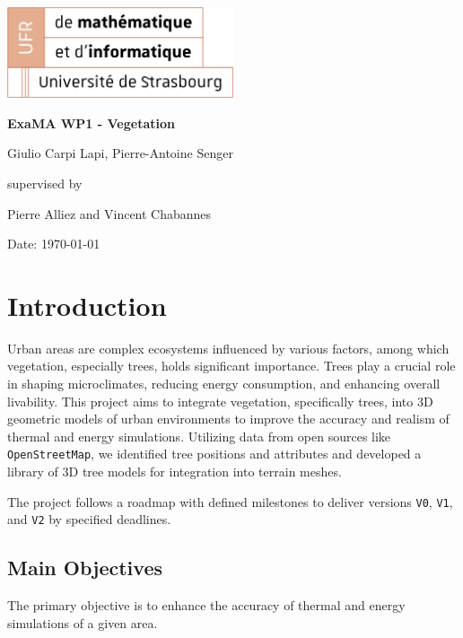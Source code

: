 \documentclass[12pt]{article}
\begin{document}
\begin{titlepage}
\centering
\includegraphics[width=0.5\textwidth]{images/logo_ufr.png}\par\vspace{1cm}
\vspace{1.5cm}
{\huge\bfseries ExaMA WP1 - Vegetation\par}
\vspace{2cm}
{\Large Giulio Carpi Lapi, Pierre-Antoine Senger\par}
\vfill
supervised by\par
Pierre Alliez and Vincent Chabannes

\vfill

{\large Date: \today\par}
\end{titlepage}

\tableofcontents
\newpage

\section{Introduction}
Urban areas are complex ecosystems influenced by various factors, among which 
vegetation, especially trees, holds significant importance. Trees play a crucial 
role in shaping microclimates, reducing energy consumption, and enhancing overall 
livability\cite{TIR4sTREEt}. This project aims to integrate vegetation, specifically trees, into 3D 
geometric models of urban environments to improve the accuracy and realism of thermal 
and energy simulations. Utilizing data from open sources like \texttt{OpenStreetMap},
we identified tree positions and attributes and developed a library of 3D tree
models for integration into terrain meshes.

The project follows a roadmap with defined milestones to deliver versions
\texttt{V0}, \texttt{V1}, and \texttt{V2} by specified  deadlines.

\subsection{Main Objectives}

The primary objective is to enhance the accuracy of thermal and energy
simulations of a given area.
\end{document}
